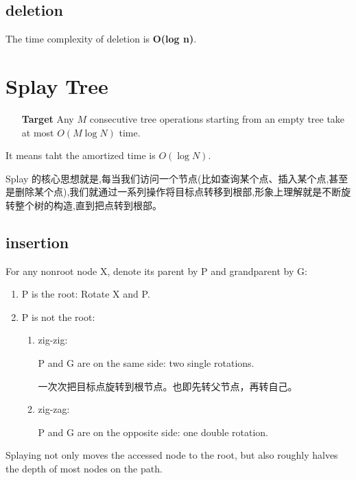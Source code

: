 \documentclass{article}
\begin{document}
\subsection{deletion}
The time complexity of deletion is \textbf{O(log n)}.

\section{Splay Tree}
\hypertarget{Splay}{}
\begin{itemize}
    \item [\textbf{Target}] Any $M$ consecutive tree operations starting from an empty tree take at most $O(M\log N)$ time. 
\end{itemize}
\par
It means taht the amortized time is $O(\log N)$. \par
Splay 的核心思想就是,每当我们访问一个节点(比如查询某个点、插入某个点,甚至是删除某个点),我们就通过一系列操作将目标点转移到根部,形象上理解就是不断旋转整个树的构造,直到把点转到根部。\par
\subsection{insertion}
For any nonroot node X, denote its parent by P and grandparent by G: 
\begin{enumerate}
    \item P is the root: Rotate X and P. 
    \item P is not the root:
    \begin{enumerate}
        \item zig-zig:\par
        P and G are on the same side: two single rotations.\par
        一次次把目标点旋转到根节点。也即先转父节点，再转自己。
        \item zig-zag:\par
        P and G are on the opposite side: one double rotation.
    \end{enumerate}
\end{enumerate}

Splaying not only moves the accessed node to the root, but also roughly halves the depth of most nodes on the path.\par
\end{document}
